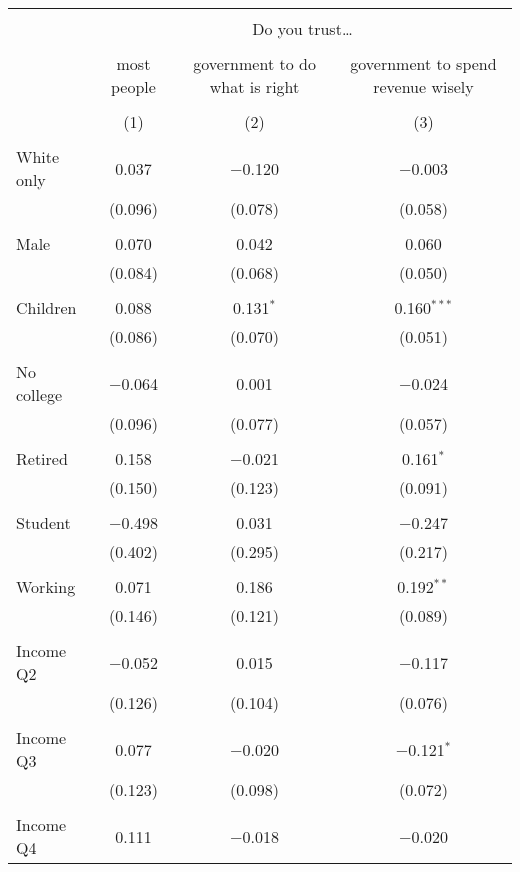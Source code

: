 
\begin{tabular}{@{\extracolsep{5pt}}lccc} 
\\[-1.8ex]\hline 
\hline \\[-1.8ex] 
 & \multicolumn{3}{c}{Do you trust…} \\ 
\cline{2-4} 
\\[-1.8ex] & most people & government to do what is right & government to spend revenue wisely \\ 
\\[-1.8ex] & (1) & (2) & (3)\\ 
\hline \\[-1.8ex] 
 White only & 0.037 & $-$0.120 & $-$0.003 \\ 
  & (0.096) & (0.078) & (0.058) \\ 
  & & & \\ 
 Male & 0.070 & 0.042 & 0.060 \\ 
  & (0.084) & (0.068) & (0.050) \\ 
  & & & \\ 
 Children & 0.088 & 0.131$^{*}$ & 0.160$^{***}$ \\ 
  & (0.086) & (0.070) & (0.051) \\ 
  & & & \\ 
 No college & $-$0.064 & 0.001 & $-$0.024 \\ 
  & (0.096) & (0.077) & (0.057) \\ 
  & & & \\ 
 Retired & 0.158 & $-$0.021 & 0.161$^{*}$ \\ 
  & (0.150) & (0.123) & (0.091) \\ 
  & & & \\ 
 Student & $-$0.498 & 0.031 & $-$0.247 \\ 
  & (0.402) & (0.295) & (0.217) \\ 
  & & & \\ 
 Working & 0.071 & 0.186 & 0.192$^{**}$ \\ 
  & (0.146) & (0.121) & (0.089) \\ 
  & & & \\ 
 Income Q2 & $-$0.052 & 0.015 & $-$0.117 \\ 
  & (0.126) & (0.104) & (0.076) \\ 
  & & & \\ 
 Income Q3 & 0.077 & $-$0.020 & $-$0.121$^{*}$ \\ 
  & (0.123) & (0.098) & (0.072) \\ 
  & & & \\ 
 Income Q4 & 0.111 & $-$0.018 & $-$0.020 \\ 

\end{tabular}

